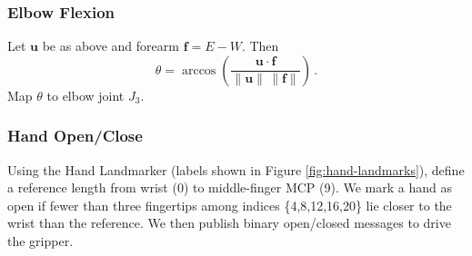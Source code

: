 \documentclass[acmsmall, screen]{acmart}
\begin{document}
\subsubsection{Elbow Flexion}
Let $\mathbf{u}$ be as above and forearm $\mathbf{f}=E-W$. Then
\begin{equation}
\theta=\arccos \!\left( \frac{\mathbf{u}\cdot\mathbf{f}}{\lVert\mathbf{u}\rVert\, \lVert\mathbf{f}\rVert} \right)\,.
\end{equation}
Map $\theta$ to elbow joint $J_3$.

\subsubsection{Hand Open/Close}
Using the Hand Landmarker (labels shown in Figure \ref{fig:hand-landmarks}), define a reference length from wrist (0) to middle-finger MCP (9). We mark a hand as open if fewer than three fingertips among indices \{4,8,12,16,20\} lie closer to the wrist than the reference. We then publish binary open/closed messages to drive the gripper.
\end{document}
